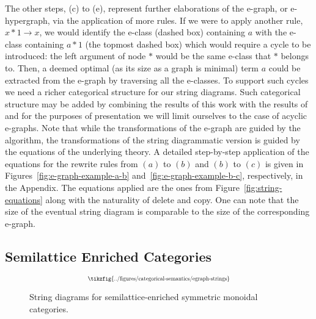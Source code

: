 The other steps, (c) to (e), represent further elaborations of the e-graph, or e-hypergraph, via the application of more rules.
If we were to apply another rule, $x * 1 \to x$, we would identify the e-class (dashed box) containing $a$ with the e-class containing $a * 1$ (the topmost dashed box) which would require a cycle to be introduced: the left argument of node $*$ would be the same e-class that $*$ belongs to.
Then, a deemed optimal (as its size as a graph is minimal) term $a$ could be extracted from the e-graph by traversing all the e-classes.
To support such cycles we need a richer categorical structure for our string diagrams.
Such categorical structure may be added by combining the results of this work with the results of~\cite{ghica_rewriting_2023} and for the purposes of presentation we will limit ourselves to the case of acyclic e-graphs.
Note that while the transformations of the e-graph are guided by the algorithm, the transformations of the string diagrammatic version is guided by the equations of the underlying theory.
A detailed step-by-step application of the equations for the rewrite rules from $(a)$ to $(b)$ and $(b)$ to $(c)$ is given in Figures~\ref{fig:e-graph-example-a-b} and~\ref{fig:e-graph-example-b-c}, respectively, in the Appendix.
The equations applied are the ones from Figure~\ref{fig:string-equations} along with the naturality of delete and copy.
One can note that the size of the eventual string diagram is comparable to the size of the corresponding e-graph.

\subsection{Semilattice Enriched Categories}

\begin{figure}
\[
	\scalebox{0.65}{
	\tikzfig{../figures/categorical-semantics/egraph-strings}
	}
\]
\captionsetup{skip=0pt, belowskip=-4ex}
\caption{String diagrams for semilattice-enriched symmetric monoidal categories.}
\label{fig:egraph-strings}
\end{figure}


